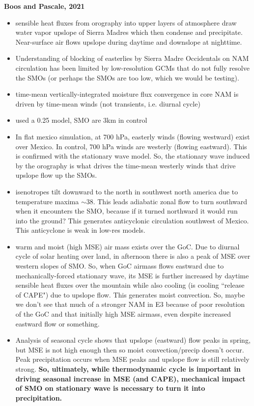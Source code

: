 \documentclass[11pt]{article}
\begin{document}
\textbf{Boos and Pascale, 2021 }
\begin{itemize}
    \item sensible heat fluxes from orography into upper layers of atmosphere draw water vapor upslope of Sierra Madres which then condense and precipitate. Near-surface air flows upslope during daytime and downslope at nighttime.
    \item Understanding of blocking of easterlies by Sierra Madre Occidentals on NAM circulation has been limited by low-resolution GCMs that do not fully resolve the SMOs (or perhaps the SMOs are too low, which we would be testing).
    \item time-mean vertically-integrated moisture flux convergence in core NAM is driven by time-mean winds (not transients, i.e. diurnal cycle)
    \item used a 0.25\textdegree{} model, SMO are 3km in control
    \item In flat mexico simulation, at 700 hPa, easterly winds (flowing westward) exist over Mexico. In control, 700 hPa winds are westerly (flowing eastward). This is confirmed with the stationary wave model. So, the stationary wave induced by the orography is what drives the time-mean westerly winds that drive upslope flow up the SMOs.
    \item isenotropes tilt downward to the north in southwest north america due to temperature maxima $\sim$38. This leads adiabatic zonal flow to turn southward when it encounters the SMO, because if it turned northward it would run into the ground? This generates anticyclonic circulation southwest of Mexico. This anticyclone is weak in low-res models. 
    \item warm and moist (high MSE) air mass exists over the GoC. Due to diurnal cycle of solar heating over land, in afternoon there is also a peak of MSE over western slopes of SMO. So, when GoC airmass flows eastward due to mechanically-forced stationary wave, its MSE is further increased by daytime sensible heat fluxes over the mountain while also cooling (is cooling ``release of CAPE") due to upslope flow. This generates moist convection. So, maybe we don't see that much of a stronger NAM in E3 because of poor resolution of the GoC and that initially high MSE airmass, even despite increased eastward flow or something.
    \item Analysis of seasonal cycle shows that upslope (eastward) flow peaks in spring, but MSE is not high enough then so moist convection/precip doesn't occur. Peak precipitation occurs when MSE peaks and upslope flow is still relatively strong. \textbf{So, ultimately, while thermodynamic cycle is important in driving seasonal increase in MSE (and CAPE), mechanical impact of SMO on stationary wave is necessary to turn it into precipitation.}

\end{itemize}
\end{document}
